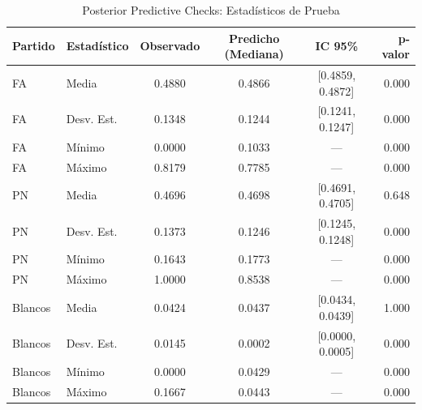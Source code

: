 \begin{table}
\caption{Posterior Predictive Checks: Estadísticos de Prueba}
\label{tab:ppc_summary}
\begin{tabular}{llcccr}
\toprule
Partido & Estadístico & Observado & Predicho (Mediana) & IC 95\% & p-valor \\
\midrule
FA & Media & 0.4880 & 0.4866 & {[}0.4859, 0.4872{]} & 0.000 \\
FA & Desv. Est. & 0.1348 & 0.1244 & {[}0.1241, 0.1247{]} & 0.000 \\
FA & Mínimo & 0.0000 & 0.1033 & --- & 0.000 \\
FA & Máximo & 0.8179 & 0.7785 & --- & 0.000 \\
PN & Media & 0.4696 & 0.4698 & {[}0.4691, 0.4705{]} & 0.648 \\
PN & Desv. Est. & 0.1373 & 0.1246 & {[}0.1245, 0.1248{]} & 0.000 \\
PN & Mínimo & 0.1643 & 0.1773 & --- & 0.000 \\
PN & Máximo & 1.0000 & 0.8538 & --- & 0.000 \\
Blancos & Media & 0.0424 & 0.0437 & {[}0.0434, 0.0439{]} & 1.000 \\
Blancos & Desv. Est. & 0.0145 & 0.0002 & {[}0.0000, 0.0005{]} & 0.000 \\
Blancos & Mínimo & 0.0000 & 0.0429 & --- & 0.000 \\
Blancos & Máximo & 0.1667 & 0.0443 & --- & 0.000 \\
\bottomrule
\end{tabular}
\end{table}
